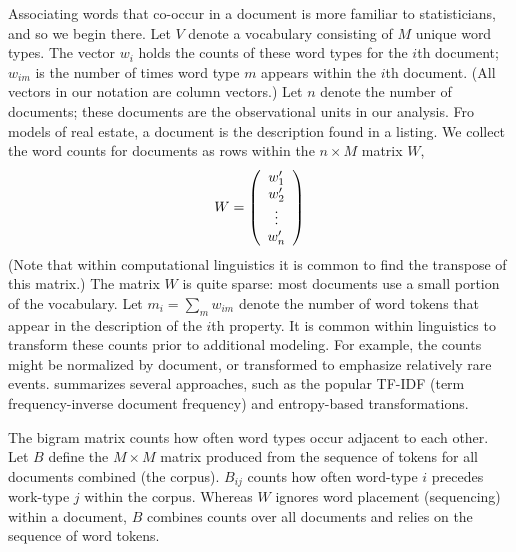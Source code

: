 \documentclass[12pt]{article}
\begin{document}
 
Associating words that co-occur in a document is more familiar to statisticians, and so we begin there.  Let $V$ denote a vocabulary consisting of $M$ unique word types.  The vector $w_i$ holds the counts of these word types for the $i$th document; $w_{im}$ is the number of times word type $m$ appears within the $i$th document.  (All vectors in our notation are column vectors.)  Let $n$ denote the number of documents; these documents are the observational units in our analysis.  Fro models of real estate, a document is the description found in a listing.  We collect the word counts for documents as rows within the $n \times M$ matrix $W$,
 \begin{displaymath}
    W = \left( \begin{array}{c}
                 w_1' \cr w_2' \cr \vdots \cr w_n'
        \end{array} \right)
 \end{displaymath}
 (Note that within computational linguistics it is common to find the transpose of this matrix.)  The matrix $W$ is quite sparse: most documents use a small portion of the  vocabulary.   Let $m_i = \sum_m w_{im}$ denote the number of word tokens that appear in the description of the $i$th property.  It is common within linguistics to transform these counts prior to additional modeling.  For example, the counts might be normalized by document, or transformed to emphasize relatively rare events. \citet{turney10} summarizes several approaches, such as the popular TF-IDF (term frequency-inverse document frequency) and entropy-based transformations.  
 
 
 The bigram matrix counts how often word types occur adjacent to each other.
  Let $B$ define the $M \times M$ matrix produced from the sequence of tokens
 for all documents combined (the corpus).  $B_{ij}$ counts how often word-type
 $i$ precedes work-type $j$ within the corpus.  Whereas $W$ ignores word
 placement (sequencing) within a document, $B$ combines counts over all documents and relies on the sequence of word tokens.
\end{document}
